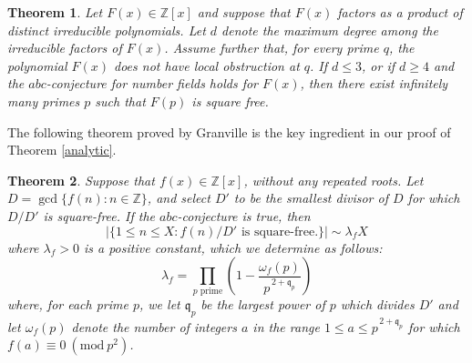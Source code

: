 \documentclass[table]{amsart}
\newcommand{\Mod}[1]{\ (\mathrm{mod}\ #1)} %
\newtheorem{theorem}{Theorem}[section]
\newcommand{\Z}{\mathbb{Z}}
\numberwithin{equation}{section}
\begin{document}
{\begin{theorem}
Let $F(x)\in \mathbb{Z}[x]$ and suppose that $F(x)$ factors as a product of distinct irreducible polynomials. Let $d$ denote the maximum degree among the irreducible factors of $F(x)$. Assume further that, for every prime $q$, the polynomial $F(x)$ does not have local obstruction at $q$. If $d\le 3$, or if $d\ge 4$ and the $abc$-conjecture for number fields holds for $F(x)$, then there exist infinitely many primes $p$ such that $F(p)$ is square free.
\end{theorem}
The following theorem proved by Granville \cite[Theorem 1]{granville} is the key ingredient in our proof of Theorem \ref{analytic}.
\begin{theorem} \label{thm:4.1}
	Suppose that $f(x) \in \Z[x]$, without any repeated roots. Let $ D=\gcd\{f(n): n \in \Z \}$, and select $D'$ to be the smallest divisor of $D$ for which $D/D'$ is square-free. If the $abc$-conjecture is true, then 
	\[ |\{ 1 \leq n \leq X : f(n)/D' \text{ is square-free.} \}| \sim \lambda_f X \]
	where $\lambda_f>0$ is a positive constant, which we determine as follows:
	\[ \lambda_f = \prod_{p \text{ prime}} \left( 1- \frac{\omega_f(p)}{p^{\,2+ \mathfrak{q}_p}} \right) \]
	where, for each prime $p$, we let $\mathfrak{q}_p$ be the largest power of $p$ which divides $D'$ and let $\omega_f(p)$ denote the number of integers $a$ in the range $1 \leq a \leq p^{\,2+ \mathfrak{q}_p}$ for which $f(a) \equiv 0 \Mod{p^2}$.
\end{theorem}
\fi}
\end{document}
